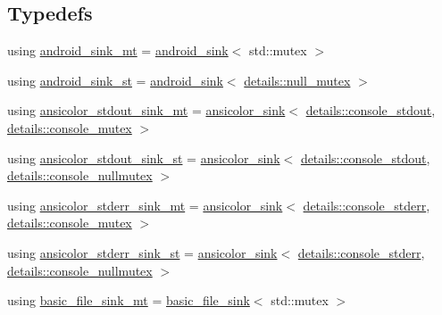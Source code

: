 \subsection*{Typedefs}
\begin{DoxyCompactItemize}
\item 
using \hyperlink{namespacespdlog_1_1sinks_afa3ee88e3e87a4908cd80f8ccd4fdd3e}{android\+\_\+sink\+\_\+mt} = \hyperlink{classspdlog_1_1sinks_1_1android__sink}{android\+\_\+sink}$<$ std\+::mutex $>$
\item 
using \hyperlink{namespacespdlog_1_1sinks_a38acf93862031f1db0e4bdcf8e8b18f3}{android\+\_\+sink\+\_\+st} = \hyperlink{classspdlog_1_1sinks_1_1android__sink}{android\+\_\+sink}$<$ \hyperlink{structspdlog_1_1details_1_1null__mutex}{details\+::null\+\_\+mutex} $>$
\item 
using \hyperlink{namespacespdlog_1_1sinks_a10475192b7db414c386fbccb7401d852}{ansicolor\+\_\+stdout\+\_\+sink\+\_\+mt} = \hyperlink{classspdlog_1_1sinks_1_1ansicolor__sink}{ansicolor\+\_\+sink}$<$ \hyperlink{structspdlog_1_1details_1_1console__stdout}{details\+::console\+\_\+stdout}, \hyperlink{structspdlog_1_1details_1_1console__mutex}{details\+::console\+\_\+mutex} $>$
\item 
using \hyperlink{namespacespdlog_1_1sinks_aa30d2f8d27e36f73043723a42199fd7b}{ansicolor\+\_\+stdout\+\_\+sink\+\_\+st} = \hyperlink{classspdlog_1_1sinks_1_1ansicolor__sink}{ansicolor\+\_\+sink}$<$ \hyperlink{structspdlog_1_1details_1_1console__stdout}{details\+::console\+\_\+stdout}, \hyperlink{structspdlog_1_1details_1_1console__nullmutex}{details\+::console\+\_\+nullmutex} $>$
\item 
using \hyperlink{namespacespdlog_1_1sinks_aa12104ff6999c8908f687c3eb87d827e}{ansicolor\+\_\+stderr\+\_\+sink\+\_\+mt} = \hyperlink{classspdlog_1_1sinks_1_1ansicolor__sink}{ansicolor\+\_\+sink}$<$ \hyperlink{structspdlog_1_1details_1_1console__stderr}{details\+::console\+\_\+stderr}, \hyperlink{structspdlog_1_1details_1_1console__mutex}{details\+::console\+\_\+mutex} $>$
\item 
using \hyperlink{namespacespdlog_1_1sinks_a3d8d6c5070124583420003b8c00ec441}{ansicolor\+\_\+stderr\+\_\+sink\+\_\+st} = \hyperlink{classspdlog_1_1sinks_1_1ansicolor__sink}{ansicolor\+\_\+sink}$<$ \hyperlink{structspdlog_1_1details_1_1console__stderr}{details\+::console\+\_\+stderr}, \hyperlink{structspdlog_1_1details_1_1console__nullmutex}{details\+::console\+\_\+nullmutex} $>$
\item 
using \hyperlink{namespacespdlog_1_1sinks_a3c2170781ef0f706f8cea55f8d6b0609}{basic\+\_\+file\+\_\+sink\+\_\+mt} = \hyperlink{classspdlog_1_1sinks_1_1basic__file__sink}{basic\+\_\+file\+\_\+sink}$<$ std\+::mutex $>$

\end{DoxyCompactItemize}
